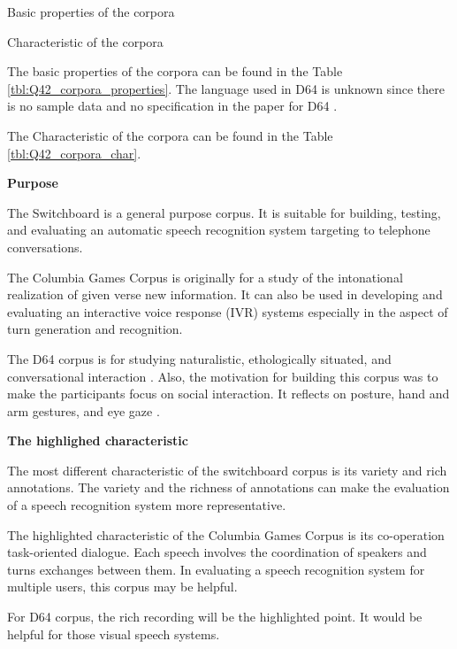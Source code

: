 \documentclass[12pt]{article}
\newenvironment{problem}[2][Problem]{\begin{trivlist}
\item[\hskip \labelsep {\bfseries #1}\hskip \labelsep {\bfseries #2.}]}{\end{trivlist}}
\begin{document}
\begin{problem}{4.2}
    \begin{table}
        \centering
        \caption{Basic properties of the corpora}
        \label{tbl:Q42_corpora_properties}    
    \end{table}

    \begin{table}
        \centering
        \caption{Characteristic of the corpora}
        \label{tbl:Q42_corpora_char}    
    \end{table}

    The basic properties of the corpora can be found in the Table \ref{tbl:Q42_corpora_properties}.
    The language used in D64 is unknown since there is no sample data and no 
    specification in the paper for D64 \cite{oertel2013d64}.

    The Characteristic of the corpora can be found in the Table \ref{tbl:Q42_corpora_char}.

\noindent\textbf{Purpose}

    The Switchboard is a general purpose corpus. It is suitable for building,
    testing, and evaluating an automatic speech recognition system targeting to 
    telephone conversations. \cite{switchboard_intro}

    The Columbia Games Corpus is originally for a study of the intonational 
    realization of given verse new information. 
    It can also be used in developing and evaluating an interactive voice 
    response (IVR) systems especially in the aspect of turn generation and recognition.
    \cite{moller2007evaluating}

    The D64 corpus is for studying naturalistic, ethologically situated, and 
    conversational interaction \cite{oertel2013d64}. 
    Also,  the motivation for building this corpus was to make the participants 
    focus on social interaction. 
    It reflects on posture, hand and arm gestures, and eye gaze \cite{oertel2013d64}.

\noindent\textbf{The highlighed characteristic}
    
    The most different characteristic of the switchboard corpus is its variety 
    and rich annotations. 
    The variety and the richness of annotations can make the evaluation of 
    a speech recognition system more representative. 

    The highlighted characteristic of the Columbia Games Corpus is its 
    co-operation task-oriented dialogue. 
    Each speech involves the coordination of speakers and turns exchanges 
    between them. 
    In evaluating a speech recognition system for multiple users, 
    this corpus may be helpful.

    For D64 corpus, the rich recording will be the highlighted point.
    It would be helpful for those visual speech systems.
\end{problem}
\end{document}
